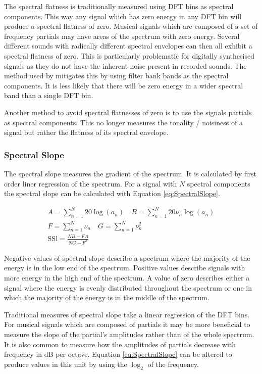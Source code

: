 			The spectral flatness is traditionally measured using DFT bins as spectral components. This way any
			signal which has zero energy in any DFT bin will produce a spectral flatness of zero. Musical
			signals which are composed of a set of frequency partials may have areas of the spectrum with zero
			energy. Several different sounds with radically different spectral envelopes can then all exhibit a
			spectral flatness of zero. This is particularly problematic for digitally synthesised signals as
			they do not have the inherent noise present in recorded sounds. The method used by
			\citet{peeters2004a} mitigates this by using filter bank bands as the spectral components. It is
			less likely that there will be zero energy in a wider spectral band than a single DFT bin. 
			
			Another method to avoid spectral flatnesses of zero is to use the signals partials as spectral
			components.  This no longer measures the tonality / noisiness of a signal but rather the flatness of
			its spectral envelope.

		\subsubsection*{Spectral Slope}
			The spectral slope measures the gradient of the spectrum. It is calculated by first order liner
			regression of the spectrum. For a signal with $N$ spectral components the spectral slope can be
			calculated with Equation \ref{eq:SpectralSlope}.

			\begin{gather}
				A = \sum_{n = 1}^{N} 20\log (a_{n}) 
				\quad 
				B = \sum_{n = 1}^{N} 20\nu_{n}\log (a_{n}) \nonumber \\
				F = \sum_{n = 1}^{N} \nu_{n} \quad G = \sum_{n = 1}^{N} \nu_{n}^{2} \nonumber \\
				\textrm{SSl} = \frac{NB - FA}
					       {NG - F^{2}}
				\label{eq:SpectralSlope}
			\end{gather}

			Negative values of spectral slope describe a spectrum where the majority of the energy is in the low
			end of the spectrum. Positive values describe signals with more energy in the high end of the
			spectrum. A value of zero describes either a signal where the energy is evenly distributed
			throughout the spectrum or one in which the majority of the energy is in the middle of the spectrum.

			Traditional measures of spectral slope take a linear regression of the DFT bins. For musical signals
			which are composed of partials it may be more beneficial to measure the slope of the partial's
			amplitudes rather than of the whole spectrum. It is also common to measure how the amplitudes of
			partials decrease with frequency in dB per octave. Equation \ref{eq:SpectralSlope} can be altered to
			produce values in this unit by using the $\log_{2}$ of the frequency.

